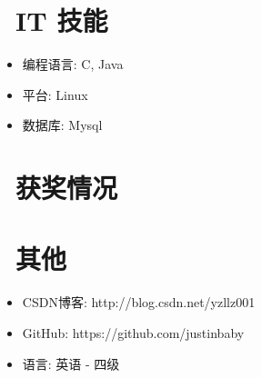 \documentclass{resume}
\begin{document}
\section{\faCogs\ IT 技能}
\begin{itemize}[parsep=0.5ex]
  \item 编程语言: C, Java
  \item 平台: Linux
  \item 数据库: Mysql
\end{itemize}

\section{\faHeartO\ 获奖情况}

\section{\faInfo\ 其他}
\begin{itemize}[parsep=0.5ex]
  \item CSDN博客: http://blog.csdn.net/yzllz001
  \item GitHub: https://github.com/justinbaby
  \item 语言: 英语 - 四级
\end{itemize}

%
%
\end{document}
